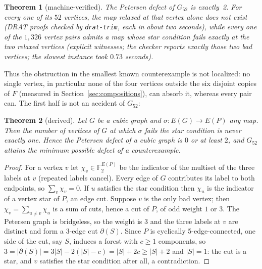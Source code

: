 \documentclass[11pt]{article}
\newtheorem{theorem}{Theorem}[section]
\theoremstyle{definition}
\theoremstyle{remark}
\newcommand{\PG}{P}
\newcommand{\Gfty}{G_{52}}
\begin{document}
\begin{theorem}[machine-verified]\label{thm:defect52}
The Petersen defect of $\Gfty$ is exactly~2. For every one of its $52$ vertices, the map relaxed
at that vertex alone does not exist (DRAT proofs checked by \texttt{drat-trim}, each in about
two seconds), while every one of the $1{,}326$ vertex pairs admits a map whose star condition
fails exactly at the two relaxed vertices (explicit witnesses; the checker reports exactly those
two bad vertices; the slowest instance took $0.73$ seconds).
\end{theorem}

Thus the obstruction in the smallest known counterexample is not localized: no single vertex,
in particular none of the four vertices outside the six disjoint copies of $F$ (measured in
Section~\ref{sec:compositions}), can absorb it, whereas every pair can. The first half is not
an accident of $\Gfty$:

\begin{theorem}[derived]\label{thm:parity}
Let $G$ be a cubic graph and $\sigma : E(G) \to E(\PG)$ any map. Then the number of vertices of
$G$ at which $\sigma$ fails the star condition is never exactly one. Hence the Petersen defect
of a cubic graph is $0$ or at least $2$, and $\Gfty$ attains the minimum possible defect of a
counterexample.
\end{theorem}

\begin{proof}
For a vertex $v$ let $\chi_v \in \mathbb F_2^{E(\PG)}$ be the indicator of the multiset of the
three labels at $v$ (repeated labels cancel). Every edge of $G$ contributes its label to both
endpoints, so $\sum_{v} \chi_v = 0$. If $u$ satisfies the star condition then $\chi_u$ is the
indicator of a vertex star of $\PG$, an edge cut. Suppose $v$ is the only bad vertex; then
$\chi_v = \sum_{u \ne v} \chi_u$ is a sum of cuts, hence a cut of $\PG$, of odd weight $1$ or
$3$. The Petersen graph is bridgeless, so the weight is $3$ and the three labels at $v$ are
distinct and form a 3-edge cut $\partial(S)$. Since $\PG$ is cyclically 5-edge-connected, one
side of the cut, say $S$, induces a forest with $c \ge 1$ components, so $3 = |\partial(S)| =
3|S| - 2(|S| - c) = |S| + 2c \ge |S| + 2$ and $|S| = 1$: the cut is a star, and $v$ satisfies
the star condition after all, a contradiction.
\end{proof}
\end{document}
